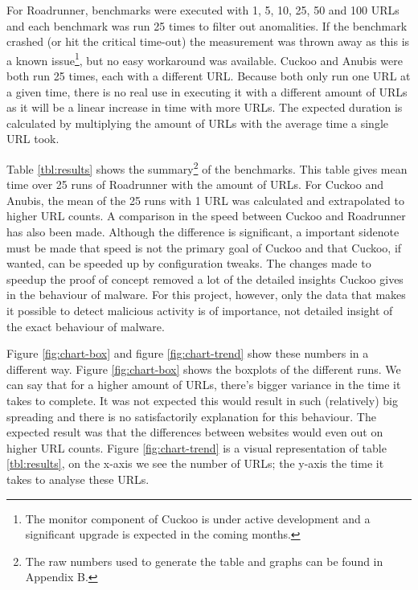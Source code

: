 For Roadrunner, benchmarks were executed with 1, 5, 10, 25, 50 and 100 URLs and each benchmark was run 25 times to filter out anomalities. If the benchmark crashed (or hit the critical time-out) the measurement was thrown away as this is a known issue\footnote{The monitor component of Cuckoo is under active development and a significant upgrade is expected in the coming months.}, but no easy workaround was available.  Cuckoo and Anubis were both run 25 times, each with a different URL. Because both only run one URL at a given time, there is no real use in executing it with a different amount of URLs as it will be a linear increase in time with more URLs. The expected duration is calculated by multiplying the amount of URLs with the average time a single URL took.

Table \ref{tbl:results} shows the summary\footnote{The raw numbers used to generate the table and graphs can be found in Appendix B.} of the benchmarks. This table gives mean time over 25 runs of Roadrunner with the amount of URLs. For Cuckoo and Anubis, the mean of the 25 runs with 1 URL was calculated and extrapolated to higher URL counts. A comparison in the speed between Cuckoo and Roadrunner has also been made. Although the difference is significant, a important sidenote must be made that speed is not the primary goal of Cuckoo and that Cuckoo, if wanted, can be speeded up by configuration tweaks. The changes made to speedup the proof of concept removed a lot of the detailed insights Cuckoo gives in the behaviour of malware. For this project, however, only the data that makes it possible to detect malicious activity is of importance, not detailed insight of the exact behaviour of malware.

Figure \ref{fig:chart-box} and figure \ref{fig:chart-trend} show these numbers in a different way. Figure \ref{fig:chart-box} shows the boxplots of the different runs. We can say that for a higher amount of URLs, there's bigger variance in the time it takes to complete. It was not expected this would result in such (relatively) big spreading and there is no satisfactorily explanation for this behaviour. The expected result was that the differences between websites would even out on higher URL counts. Figure \ref{fig:chart-trend} is a visual representation of table \ref{tbl:results}, on the x-axis we see the number of URLs; the y-axis the time it takes to analyse these URLs. 

\pagebreak

